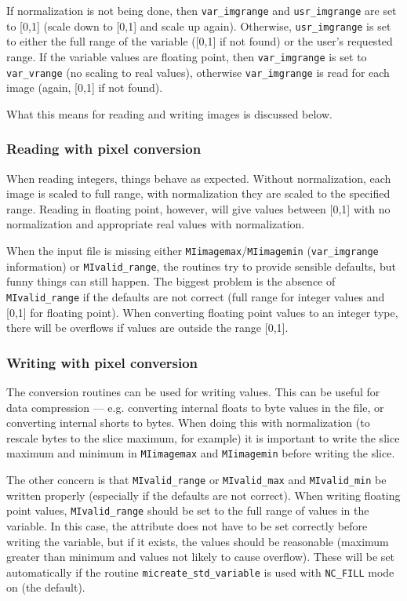 If normalization is not being done, then \verb+var_imgrange+ and
\verb+usr_imgrange+ are set to [0,1] (scale down to [0,1] and
scale up again).  Otherwise, \verb+usr_imgrange+ is set to either the
full range of the variable ([0,1] if not found) or the user's
requested range. If the variable values are floating point, then
\verb+var_imgrange+ is set to \verb+var_vrange+ (no scaling to real
values), otherwise \verb+var_imgrange+ is read for each image (again,
[0,1] if not found).

What this means for reading and writing images is discussed below.

\subsubsection{Reading with pixel conversion}

When reading integers, things behave as expected. Without
normalization, each image is scaled to full range, with normalization
they are scaled to the specified range. Reading in floating point,
however, will give values between [0,1] with no normalization and
appropriate real values with normalization.

When the input file is missing either
\verb+MIimagemax+/\verb+MIimagemin+ (\verb+var_imgrange+ information)
or \verb+MIvalid_range+, the routines try to provide sensible
defaults, but funny things can still happen. The biggest problem is
the absence of \verb+MIvalid_range+ if the defaults are not correct
(full range for integer values and [0,1] for floating point). When
converting floating point values to an integer type, there will be
overflows if values are outside the range [0,1].

\subsubsection{Writing with pixel conversion}

The conversion routines can be used for writing values. This can be
useful for data compression --- e.g. converting internal floats to
byte values in the file, or converting internal shorts to bytes. When
doing this with normalization (to rescale bytes to the slice maximum,
for example) it is important to write the slice maximum and minimum in
\verb+MIimagemax+ and \verb+MIimagemin+ before writing the slice.

The other concern is that \verb+MIvalid_range+ or \verb+MIvalid_max+
and \verb+MIvalid_min+ be written properly (especially if the defaults
are not correct). When writing floating point values,
\verb+MIvalid_range+ should be set to the full range of values in the
variable. In this case, the attribute does not have to be set
correctly before writing the variable, but if it exists, the values
should be reasonable (maximum greater than minimum and values not
likely to cause overflow). These will be set automatically if the
routine \verb+micreate_std_variable+ is used with
\verb+NC_FILL+ mode on (the default).

